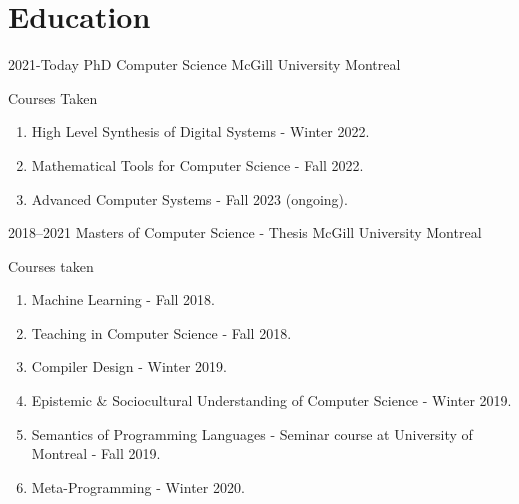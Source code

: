 
\section{Education}

    \cventry
        {2021-Today}
        {PhD Computer Science}
        {McGill University}
        {Montreal}
        {}
        {
        {
            Courses Taken
            \begin{multicols}{2}
                \begin{enumerate}
                  \item High Level Synthesis of Digital Systems - Winter 2022.
                  \item Mathematical Tools for Computer Science - Fall 2022.
                  \item Advanced Computer Systems - Fall 2023 (ongoing).
                \end{enumerate}
            \end{multicols}
              }
    }  %

    \cventry
        {2018--2021}
        {Masters of Computer Science - Thesis}
        {McGill University}
        {Montreal}
        {}
        {
            Courses taken
            \begin{multicols}{2}
                \begin{enumerate}
                  \item Machine Learning - Fall 2018.
                  \item Teaching in Computer Science - Fall 2018.
                  \item Compiler Design - Winter 2019.
                  \item Epistemic \& Sociocultural Understanding of Computer Science - Winter 2019. 
                  \item Semantics of Programming Languages - Seminar course at University of Montreal - Fall 2019.
                  \item Meta-Programming - Winter 2020.
                \end{enumerate}
            \end{multicols}      
        }  %
    
